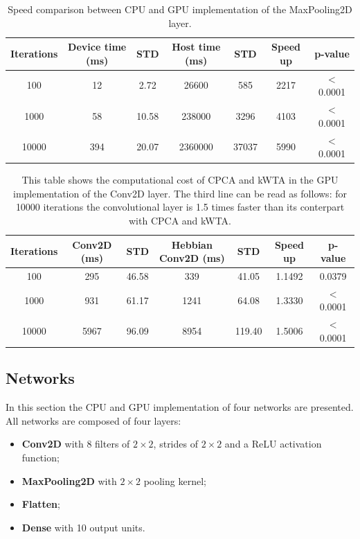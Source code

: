 \documentclass[11pt]{report}
\begin{document}
\begin{table}[h!]
\centering
\begin{tabular}{ c | c c | c c | c c }
Iterations & Device time (ms) & STD & Host time (ms) & STD & Speed up & p-value\\
\hline
100   & 12  & 2.72  & 26600   & 585   & 2217 & $<$ 0.0001 \\
1000  & 58  & 10.58  & 238000  & 3296  & 4103 & $<$ 0.0001 \\
10000 & 394 & 20.07 & 2360000 & 37037 & 5990 & $<$ 0.0001
\end{tabular}
\caption[Speed benchmark: MaxPooling2D layer]{Speed comparison between CPU and GPU implementation of the MaxPooling2D layer.}
\label{tab:max_pooling_2d_res}
\end{table}

\begin{table}[!htb]
\centering
\begin{tabular}{ c | c c | c c | c c }
Iterations & Conv2D (ms) & STD & Hebbian Conv2D (ms) & STD & Speed up & p-value\\
\hline
100   & 295  & 46.58 & 339  & 41.05  & 1.1492 & 0.0379 \\
1000  & 931  & 61.17 & 1241 & 64.08  & 1.3330 & $<$ 0.0001 \\
10000 & 5967 & 96.09 & 8954 & 119.40 & 1.5006 & $<$ 0.0001
\end{tabular}
\caption[Speed benchmark: Computational cost of CPCA and kWTA]{This table shows the computational cost of CPCA and kWTA in the GPU implementation of the Conv2D layer. The third line can be read as follows: for 10000 iterations the convolutional layer is 1.5 times faster than its conterpart with CPCA and kWTA.}
\label{table:CNN_vs_HCNN}
\end{table}
\FloatBarrier

\subsection{Networks}

In this section the CPU and GPU implementation of four networks are presented. All networks are composed of four layers:

\begin{itemize}
	\item \textbf{Conv2D} with 8 filters of $2\times2$, strides of $2\times2$ and a ReLU activation function;
	\item \textbf{MaxPooling2D} with $2\times2$ pooling kernel;
	\item \textbf{Flatten};
	\item \textbf{Dense} with 10 output units.
\end{itemize}
\end{document}
